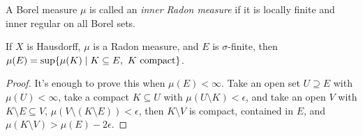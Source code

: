 \documentclass[letterpaper,11pt]{report}
\begin{document}
\begin{defn} A Borel measure $\mu$ is called an \emph{inner Radon measure} if it is locally finite and inner regular on all Borel sets.
\end{defn}

\begin{prop}\label{radon-sigma-finite} If $X$ is Hausdorff, $\mu$ is a Radon measure, and $E$ is $\sigma$-finite, then $\mu(E) = \sup \{\mu(K) \mid K \subseteq E,\ K\text{ \rm compact}\}$. 
\end{prop}
\begin{proof} It's enough to prove this when $\mu(E) < \infty$. Take an open set $U \supseteq E$ with $\mu(U) < \infty$, take a compact $K \subseteq U$ with $\mu(U\setminus K) < \epsilon$, and take an open $V$ with $K \setminus E \subseteq V$, $\mu(V\setminus(K\setminus E)) < \epsilon$, then $K\setminus V$ is compact, contained in $E$, and $\mu(K\setminus V) > \mu(E) - 2\epsilon$.
\end{proof}



\end{document}
